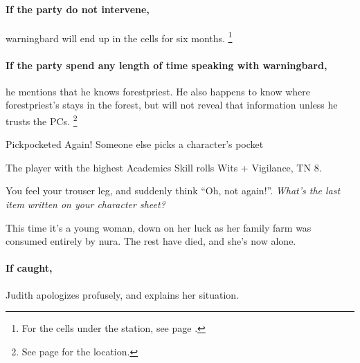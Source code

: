 \begin{multicols}{2}
\paragraph{If the party do not intervene,}
\gls{warningbard} will end up in the cells for six months.
\footnote{For the cells under the  station, see page \pageref{guardstation}.}

\warningbard

\paragraph{If the party spend any length of time speaking with \gls{warningbard},}
he mentions that he knows \gls{forestpriest}.
He also happens to know where \gls{forestpriest}'s stays in the forest, but will not reveal that information unless he trusts the PCs.
\footnote{See page \pageref{lostcity} for the location.}

{Pickpocketed Again!}%
{Someone else picks a character's pocket}%

The player with the highest Academics Skill rolls Wits + Vigilance, TN 8.

\begin{boxtext}

  You feel your trouser leg, and suddenly think ``Oh, not again!''.  \textit{What's the last item written on your character sheet?}

\end{boxtext}

This time it's a young woman, down on her luck as her family farm was consumed entirely by nura.
The rest have died, and she's now alone.

\paragraph{If caught,}
Judith apologizes profusely, and explains her situation.



\end{multicols}

\stopcontents[Town]
\stopcontents[sq]
